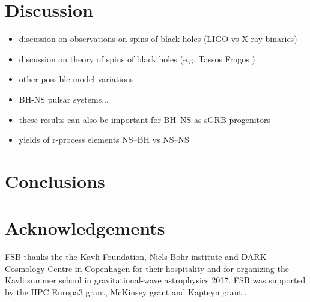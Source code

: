 \documentclass[a4paper,fleqn,usenatbib,useAMS,usedcolumn]{mnras}
\begin{document}
%
%
%
%
% 
%
%

 
 

\section{Discussion}
\label{sec:discussion}
%
\begin{itemize}
	\item discussion on observations on spins of black holes (LIGO vs X-ray binaries) 
	\item discussion on theory of spins of black holes (e.g. Tassos Fragos ) 
	\item other possible model variations
	\item BH-NS pulsar systems...
	\item these results can also be important for BH--NS as sGRB progenitors 
	\item yields of r-process elements NS--BH vs NS--NS 
\end{itemize}


\section{Conclusions}
\label{sec:conclusion}













\section*{Acknowledgements}

 

FSB thanks the the Kavli Foundation, Niels Bohr institute and DARK Cosmology Centre in Copenhagen for their hospitality and for organizing the Kavli summer school in gravitational-wave astrophysics 2017.  FSB was supported by the HPC  Europa3 grant, McKinsey grant and Kapteyn grant..
\end{document}

